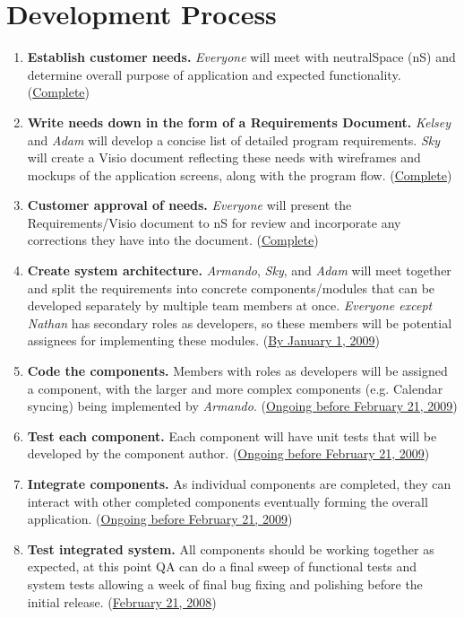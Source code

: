 \documentclass[11pt]{article}
\begin{document}
\section{Development Process}
\begin{enumerate}
 \item \textbf{Establish customer needs.} \textit{Everyone} will meet with neutralSpace (nS) and determine overall purpose of application and expected functionality. (\underline{Complete})
 \item \textbf{Write needs down in the form of a Requirements Document.} \textit{Kelsey} and \textit{Adam} will develop a concise list of detailed program requirements. \textit{Sky} will create a Visio document reflecting these needs with wireframes and mockups of the application screens, along with the program flow. (\underline{Complete})
 \item \textbf{Customer approval of needs.} \textit{Everyone} will present the Requirements/Visio document to nS for review and incorporate any corrections they have into the document. (\underline{Complete})
 \item \textbf{Create system architecture.} \textit{Armando}, \textit{Sky}, and \textit{Adam} will meet together and split the requirements into concrete components/modules that can be developed separately by multiple team members at once. \textit{Everyone except Nathan} has secondary roles as developers, so these members will be potential assignees for implementing these modules. (\underline{By January 1, 2009})
 \item \textbf{Code the components.} Members with roles as developers will be assigned a component, with the larger and more complex components (e.g. Calendar syncing) being implemented by \textit{Armando}. (\underline{Ongoing before February 21, 2009})
 \item \textbf{Test each component.} Each component will have unit tests that will be developed by the component author. (\underline{Ongoing before February 21, 2009})
 \item \textbf{Integrate components.} As individual components are completed, they can interact with other completed components eventually forming the overall application. (\underline{Ongoing before February 21, 2009})
 \item \textbf{Test integrated system.} All components should be working together as expected, at this point QA can do a final sweep of functional tests and system tests allowing a week of final bug fixing and polishing before the initial release. (\underline{February 21, 2008})
\end{enumerate}
\end{document}
